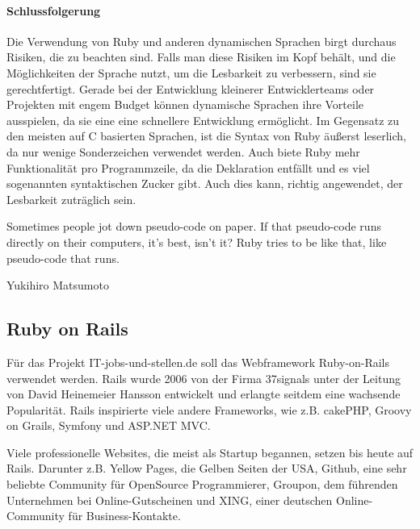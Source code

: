 \paragraph{Schlussfolgerung}

Die Verwendung von Ruby und anderen dynamischen Sprachen birgt durchaus Risiken, die zu beachten sind. Falls man diese Risiken im Kopf behält, und die Möglichkeiten der Sprache nutzt, um die Lesbarkeit zu verbessern, sind sie gerechtfertigt. Gerade bei der Entwicklung kleinerer Entwicklerteams oder Projekten mit engem Budget können dynamische Sprachen ihre Vorteile ausspielen, da sie eine eine schnellere Entwicklung ermöglicht. Im Gegensatz zu den meisten auf C basierten Sprachen, ist die Syntax von Ruby äußerst leserlich, da nur wenige Sonderzeichen verwendet werden. Auch biete Ruby mehr Funktionalität pro Programmzeile, da die Deklaration entfällt und es viel sogenannten syntaktischen Zucker gibt. Auch dies kann, richtig angewendet, der Lesbarkeit zuträglich sein.
\epigraph{Sometimes people jot down pseudo-code on paper. If that pseudo-code runs directly on their computers, it's best, isn't it? Ruby tries to be like that, like pseudo-code that runs. }{Yukihiro Matsumoto}


\subsection{Ruby on Rails}

Für das Projekt IT-jobs-und-stellen.de soll das Webframework Ruby-on-Rails verwendet werden. Rails wurde 2006 von der Firma 37signals unter der Leitung von David Heinemeier Hansson entwickelt und erlangte seitdem eine wachsende Popularität. Rails inspirierte viele andere Frameworks, wie z.B. cakePHP, Groovy on Grails, Symfony und ASP.NET MVC.

Viele professionelle Websites, die meist als Startup begannen, setzen bis heute auf Rails. Darunter z.B. Yellow Pages, die Gelben Seiten der USA, Github, eine sehr beliebte Community für OpenSource Programmierer,  Groupon, dem führenden Unternehmen bei Online-Gutscheinen und XING, einer deutschen Online-Community für Business-Kontakte.

